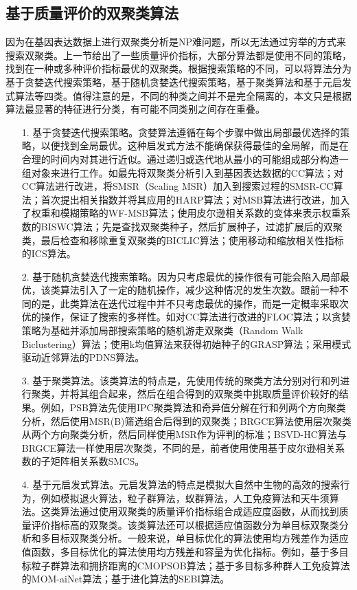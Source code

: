   \subsection{基于质量评价的双聚类算法}
  因为在基因表达数据上进行双聚类分析是NP难问题，所以无法通过穷举的方式来搜索双聚类。上一节给出了一些质量评价指标，大部分算法都是使用不同的策略，找到在一种或多种评价指标最优的双聚类。根据搜索策略的不同，可以将算法分为基于贪婪迭代搜索策略，基于随机贪婪迭代搜索策略，基于聚类算法和基于元启发式算法等四类。值得注意的是，不同的种类之间并不是完全隔离的，本文只是根据算法最显著的特征进行分类，有可能不同类别之间存在重叠。
  \begin{enumerate}
    \item[1.] 基于贪婪迭代搜索策略。贪婪算法遵循在每个步骤中做出局部最优选择的策略，以便找到全局最优。这种启发式方法不能确保获得最佳的全局解，而是在合理的时间内对其进行近似。通过递归或迭代地从最小的可能组成部分构造一组对象来进行工作。如最先将双聚类分析引入到基因表达数据的CC算法；对CC算法进行改进，将SMSR（Scaling MSR）加入到搜索过程的SMSR-CC算法；首次提出相关指数并将其应用的HARP算法；对MSB算法进行改进，加入了权重和模糊策略的WF-MSB算法；使用皮尔逊相关系数的变体来表示权重系数的BISWC算法；先是查找双聚类种子，然后扩展种子，过滤扩展后的双聚类，最后检查和移除重复双聚类的BICLIC算法；使用移动和缩放相关性指标的ICS算法。

    \item[2.] 基于随机贪婪迭代搜索策略。因为只考虑最优的操作很有可能会陷入局部最优，该类算法引入了一定的随机操作，减少这种情况的发生次数。跟前一种不同的是，此类算法在迭代过程中并不只考虑最优的操作，而是一定概率采取次优的操作，保证了搜索的多样性。如对CC算法进行改进的FLOC算法；以贪婪策略为基础并添加局部搜索策略的随机游走双聚类（Random Walk Biclustering）算法；使用k均值算法来获得初始种子的GRASP算法；采用模式驱动近邻算法的PDNS算法。
    
    \item[3.] 基于聚类算法。该类算法的特点是，先使用传统的聚类方法分别对行和列进行聚类，并将其组合起来，然后在组合得到的双聚类中挑取质量评价较好的结果。例如，PSB算法先使用IPC聚类算法和奇异值分解在行和列两个方向聚类分析，然后使用MSR(B)筛选组合后得到的双聚类；BRGCE算法使用层次聚类从两个方向聚类分析，然后同样使用MSR作为评判的标准；BSVD-HC算法与BRGCE算法一样使用层次聚类，不同的是，前者使用使用基于皮尔逊相关系数的子矩阵相关系数SMCS。
    
    \item[4.] 基于元启发式算法。元启发算法的特点是模拟大自然中生物的高效的搜索行为，例如模拟退火算法，粒子群算法，蚁群算法，人工免疫算法和天牛须算法。这类算法通过使用双聚类的质量评价指标组合成适应度函数，从而找到质量评价指标高的双聚类。该类算法还可以根据适应值函数分为单目标双聚类分析和多目标双聚类分析。一般来说，单目标优化的算法使用均方残差作为适应值函数，多目标优化的算法使用均方残差和容量为优化指标。例如，基于多目标粒子群算法和拥挤距离的CMOPSOB算法；基于多目标多种群人工免疫算法的MOM-aiNet算法；基于进化算法的SEBI算法。
  \end{enumerate}

